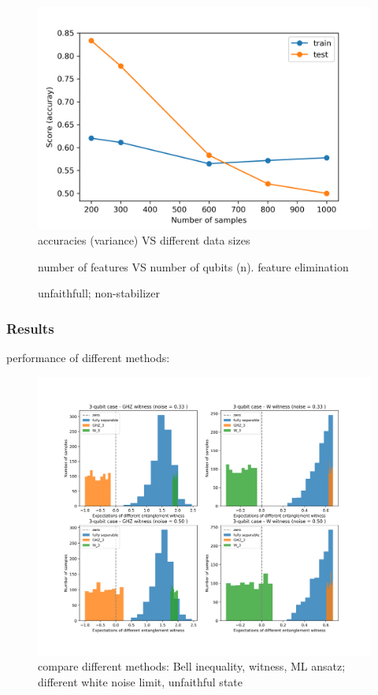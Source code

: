 \documentclass[
10pt,
aps,
pra,
linenumbers,
floatfix,
]{revtex4-2}
\theoremstyle{plain}
\theoremstyle{definition}
\begin{document}
\begin{figure}[!ht]
	\centering
	\includegraphics[width=.4\linewidth]{./notebook/two_qubit_scores.png}
	\caption{accuracies (variance) VS different data sizes}
\end{figure}
\begin{figure}[!ht]
	\centering
	\caption{number of features VS number of qubits (n). feature elimination}
\end{figure}

\begin{figure}[!ht]
	\centering
	\caption{unfaithfull; non-stabilizer}
\end{figure}

\subsubsection{Results}
performance of different methods: 
\begin{figure}[!ht]
	\centering
	\includegraphics[width=.9\linewidth]{./notebook/fidelity_witness_compare.png}
	\caption{compare different methods: Bell inequality, witness, ML ansatz; different white noise limit, unfaithful state}
\end{figure}
\end{document}
